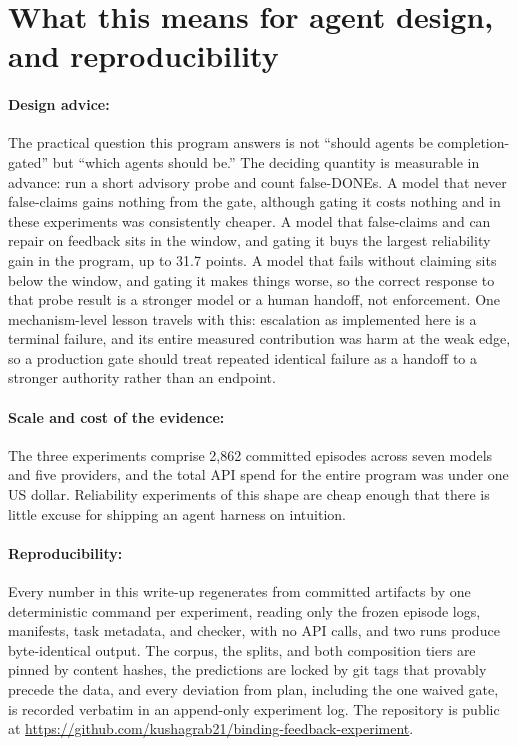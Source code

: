 \section{What this means for agent design, and reproducibility}

\paragraph{Design advice:} The practical question this program answers is not ``should agents be completion-gated'' but ``which agents should be.'' The deciding quantity is measurable in advance: run a short advisory probe and count false-DONEs. A model that never false-claims gains nothing from the gate, although gating it costs nothing and in these experiments was consistently cheaper. A model that false-claims and can repair on feedback sits in the window, and gating it buys the largest reliability gain in the program, up to 31.7 points. A model that fails without claiming sits below the window, and gating it makes things worse, so the correct response to that probe result is a stronger model or a human handoff, not enforcement. One mechanism-level lesson travels with this: escalation as implemented here is a terminal failure, and its entire measured contribution was harm at the weak edge, so a production gate should treat repeated identical failure as a handoff to a stronger authority rather than an endpoint.

\paragraph{Scale and cost of the evidence:} The three experiments comprise 2,862 committed episodes across seven models and five providers, and the total API spend for the entire program was under one US dollar. Reliability experiments of this shape are cheap enough that there is little excuse for shipping an agent harness on intuition.

\paragraph{Reproducibility:} Every number in this write-up regenerates from committed artifacts by one deterministic command per experiment, reading only the frozen episode logs, manifests, task metadata, and checker, with no API calls, and two runs produce byte-identical output. The corpus, the splits, and both composition tiers are pinned by content hashes, the predictions are locked by git tags that provably precede the data, and every deviation from plan, including the one waived gate, is recorded verbatim in an append-only experiment log. The repository is public at \url{https://github.com/kushagrab21/binding-feedback-experiment}.

